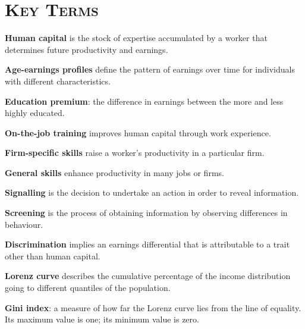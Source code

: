 \newpage
{}
	\section*{\textsc{Key Terms}}
\begin{keyterms}
\textbf{Human capital} is the stock of expertise accumulated by a worker that determines future productivity and earnings.

\textbf{Age-earnings profiles} define the pattern of earnings over time for individuals with different characteristics.

\textbf{Education premium}: the difference in earnings between the more and less highly educated.

\textbf{On-the-job training} improves human capital through work experience.

\textbf{Firm-specific skills} raise a worker's productivity in a particular firm.

\textbf{General skills} enhance productivity in many jobs or firms.

\textbf{Signalling} is the decision to undertake an action in order to reveal information.

\textbf{Screening} is the process of obtaining information by observing differences in behaviour.

\textbf{Discrimination} implies an earnings differential that is attributable to a trait other than human capital.

\textbf{Lorenz curve} describes the cumulative percentage of the income distribution going to different quantiles of the population.

\textbf{Gini index}: a measure of how far the Lorenz curve lies from the line of equality. Its maximum value is one; its minimum value is zero.
\end{keyterms}